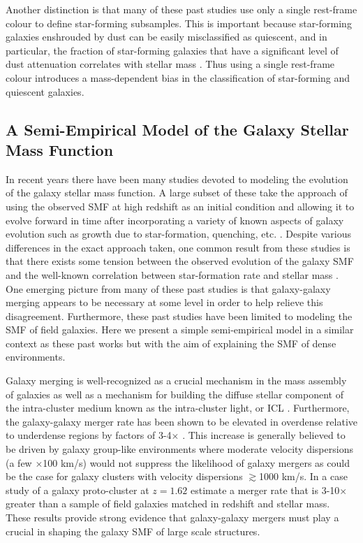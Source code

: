\documentclass[a4paper,fleqn,usenatbib]{mnras}
\begin{document}
Another distinction is that many of these past studies use only a single rest-frame colour to define star-forming subsamples.
This is important because star-forming galaxies enshrouded by dust can be easily misclassified as quiescent, and in particular, the fraction of star-forming galaxies that have a significant level of dust attenuation correlates with stellar mass \citep{Wild2014, Martis2016}.
Thus using a single rest-frame colour introduces a mass-dependent bias in the classification of star-forming and quiescent galaxies.






\subsection{A Semi-Empirical Model of the Galaxy Stellar Mass Function}
\label{sec:model}



In recent years there have been many studies devoted to modeling the evolution of the galaxy stellar mass function.
A large subset of these take the approach of using the observed SMF at high redshift as an initial condition and allowing it to evolve forward in time after incorporating a variety of known aspects of galaxy evolution such as growth due to star-formation, quenching, etc. \citep[e.g.][]{Leja2015, Tomczak2016, Contini2017, Steinhardt2017}.
Despite various differences in the exact approach taken, one common result from these studies is that there exists some tension between the observed evolution of the galaxy SMF and the well-known correlation between star-formation rate and stellar mass \citep[e.g.][]{Noeske2007}.
One emerging picture from many of these past studies is that galaxy-galaxy merging appears to be necessary at some level in order to help relieve this disagreement.
Furthermore, these past studies have been limited to modeling the SMF of field galaxies.
Here we present a simple semi-empirical model in a similar context as these past works but with the aim of explaining the SMF of dense environments.


Galaxy merging is well-recognized as a crucial mechanism in the mass assembly of galaxies \citep[e.g.][]{LeFevre2000, Guo2008, Lin2010, RodriguezGomez2016} as well as a mechanism for building the diffuse stellar component of the intra-cluster medium known as the intra-cluster light, or ICL \citep[e.g.][]{Willman2004, Rudick2006, Murante2007, Contini2014}.
Furthermore, the galaxy-galaxy merger rate has been shown to be elevated in overdense relative to underdense regions by factors of 3-4$\times$ \citep{Lin2010, Kampczyk2013}.
This increase is generally believed to be driven by galaxy group-like environments where moderate velocity dispersions (a few $\times$100 km/s) would not suppress the likelihood of galaxy mergers as could be the case for galaxy clusters with velocity dispersions $\gtrsim$1000 km/s.
In a case study of a galaxy proto-cluster at $z=1.62$ \citet{Lotz2013} estimate a merger rate that is 3-10$\times$ greater than a sample of field galaxies matched in redshift and stellar mass.
These results provide strong evidence that galaxy-galaxy mergers must play a crucial in shaping the galaxy SMF of large scale structures.
\end{document}
